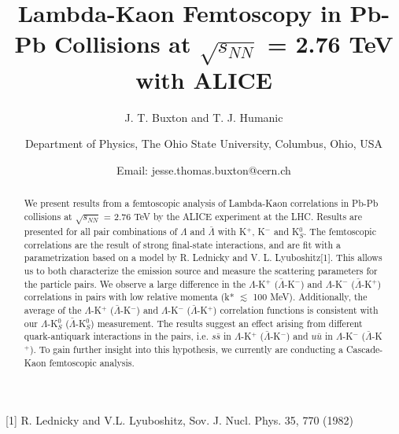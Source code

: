 \documentclass[ALICE,manyauthors]{ALICE_analysis_notes}
\begin{document}
%
%
%
\begin{titlepage}
%
\PHnumber{} 
\PHdate{\today}
%
\title{Lambda-Kaon Femtoscopy in Pb-Pb Collisions at $\sqrt{s_{NN}}$ = 2.76 TeV with ALICE}
%
\author{J. T. Buxton and T. J. Humanic}
\author{
Department of Physics, The Ohio State University, Columbus, Ohio, USA\\
}
\author{Email: jesse.thomas.buxton@cern.ch}
\begin{abstract}
We present results from a femtoscopic analysis of Lambda-Kaon correlations in Pb-Pb collisions at $\sqrt{s_{NN}}$ = 2.76 TeV by the ALICE experiment at the LHC.  Results are presented for all pair combinations of $\Lambda$ and $\bar{\Lambda}$ with K$^{+}$, K$^{-}$ and K$^{0}_{S}$.  The femtoscopic correlations are the result of strong final-state interactions, and are fit with a parametrization based on a model by R. Lednicky and V. L. Lyuboshitz[1].  This allows us to both characterize the emission source and measure the scattering parameters for the particle pairs.  We observe a large difference in the $\Lambda$-K$^{+}$ ($\bar{\Lambda}$-K$^{-}$) and $\Lambda$-K$^{-}$ ($\bar{\Lambda}$-K$^{+}$) correlations in pairs with low relative momenta (k* $\lesssim$ 100 MeV).  Additionally, the average of the $\Lambda$-K$^{+}$ ($\bar{\Lambda}$-K$^{-}$) and $\Lambda$-K$^{-}$ ($\bar{\Lambda}$-K$^{+}$) correlation functions is consistent with our $\Lambda$-K$^{0}_{S}$ ($\bar{\Lambda}$-K$^{0}_{S}$) measurement.  The results suggest an effect arising from different quark-antiquark interactions in the pairs, i.e. $s\bar{s}$ in $\Lambda$-K$^{+}$ ($\bar{\Lambda}$-K$^{-}$) and $u\bar{u}$ in $\Lambda$-K$^{-}$ ($\bar{\Lambda}$-K$^{+}$).  To gain further insight into this hypothesis, we currently are conducting a Cascade-Kaon femtoscopic analysis.
\end{abstract}

[1] R. Lednicky and V.L. Lyuboshitz, Sov. J. Nucl. Phys. 35, 770 (1982)
\end{titlepage}
\end{document}
